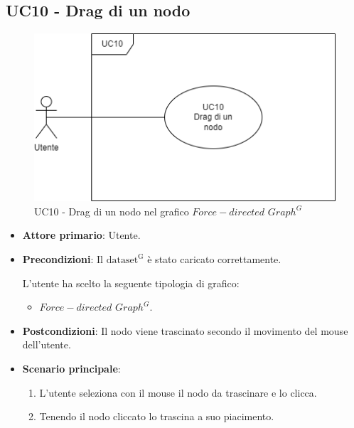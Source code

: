 \newpage


\subsection{UC10 - Drag di un nodo}
\label{sec:UC10}
\begin{figure}[h!]
    \centering
    \includegraphics[scale=0.60]{../../assets/drag_nodo.png}
    \caption{UC10 - Drag di un nodo nel grafico $Force-directed$ $Graph^{G}$}
\end{figure}
\begin{itemize}
    \item \textbf{Attore primario}: Utente.
    \item \textbf{Precondizioni}: Il ${\mathrm{dataset^{G}}}$ è stato caricato correttamente. \par L'utente ha scelto la seguente tipologia di grafico:
    \begin{itemize}
    		\item $Force-directed$ $Graph^{G}$.
    \end{itemize}
    \item \textbf{Postcondizioni}: Il nodo viene trascinato secondo il movimento del mouse dell'utente.
    \item \textbf{Scenario principale}:
          \begin{enumerate}
              \item L'utente seleziona con il mouse il nodo da trascinare e lo clicca.
              \item Tenendo il nodo cliccato lo trascina a suo piacimento.
          \end{enumerate}
\end{itemize}

